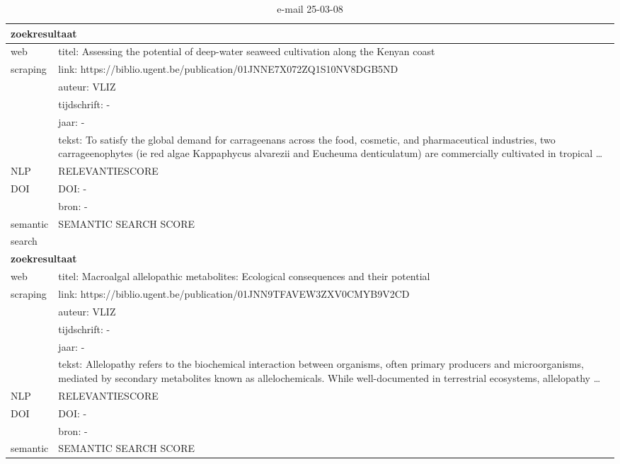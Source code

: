\begin{table}[h!]
    \caption{e-mail 25-03-08}
    \centering
    \begin{tabularx}{\textwidth}{|p{4cm}|X|} 
        \hline
        \multicolumn{2}{|X|}{\textbf{zoekresultaat}} \\
        \hline
        web &titel:  Assessing the potential of deep-water seaweed cultivation along the Kenyan coast\\
        scraping&link: https://biblio.ugent.be/publication/01JNNE7X072ZQ1S10NV8DGB5ND\\
        &auteur: VLIZ\\
        &tijdschrift: -\\
        &jaar: -\\
        &tekst: To satisfy the global demand for carrageenans across the food, cosmetic, and pharmaceutical industries, two carrageenophytes (ie red algae Kappaphycus alvarezii and Eucheuma denticulatum) are commercially cultivated in tropical …\\
        \hline
        NLP&RELEVANTIESCORE\\
        \hline
        DOI&DOI: -\\
        &bron: -\\
        \hline
        semantic&SEMANTIC SEARCH SCORE\\
        search&\\
        \hline
        \multicolumn{2}{|X|}{\textbf{zoekresultaat}} \\
        \hline
        web &titel: Macroalgal allelopathic metabolites: Ecological consequences and their potential\\
        scraping&link: https://biblio.ugent.be/publication/01JNN9TFAVEW3ZXV0CMYB9V2CD\\
        &auteur: VLIZ\\
        &tijdschrift: -\\
        &jaar: -\\
        &tekst: Allelopathy refers to the biochemical interaction between organisms, often primary producers and microorganisms, mediated by secondary metabolites known as allelochemicals. While well-documented in terrestrial ecosystems, allelopathy …\\
        \hline
        NLP&RELEVANTIESCORE\\
        \hline
        DOI&DOI: -\\
        &bron: -\\
        \hline
        semantic&SEMANTIC SEARCH SCORE\\

\end{tabularx}
\end{table}
